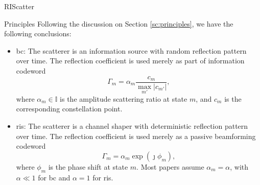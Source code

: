 \begin{section}{RIScatter}
	\label{sc:riscatter}
	\begin{subsection}{Principles}
		Following the discussion on Section \ref{sc:principles}, we have the following conclusions:
		\begin{itemize}
			\item \gls{bc}: The scatterer is an information source with random reflection pattern over time.
			The reflection coefficient is used merely as part of information codeword \cite{Thomas2012a}
			\begin{equation}
				\Gamma_m = \alpha_m \frac{c_m}{\max_{m'} \lvert c_{m'} \rvert},
				\label{eq:backscatter_modulation}
			\end{equation}
			where $\alpha_m \in \mathbb{I}$ is the amplitude scattering ratio at state $m$, and $c_m$ is the corresponding constellation point.
			\item \gls{ris}: The scatterer is a channel shaper with deterministic reflection pattern over time.
			The reflection coefficient is used merely as a passive beamforming codeword \cite{Wu2018}
			\begin{equation}
				\Gamma_m = \alpha_m \exp(\jmath \phi_m),
				\label{eq:passive_beamforming}
			\end{equation}
			where $\phi_m$ is the phase shift at state $m$. Most papers assume $\alpha_m = \alpha$, with $\alpha \ll 1$ for \gls{bc} and $\alpha=1$ for \gls{ris}.
		\end{itemize}


\end{subsection}
\end{section}
